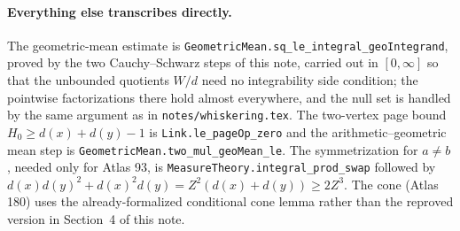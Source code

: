 \documentclass[11pt]{article}
\begin{document}
\paragraph{Everything else transcribes directly.}
The geometric-mean estimate is
\texttt{GeometricMean.sq\_le\_integral\_geoIntegrand}, proved by the two
Cauchy--Schwarz steps of this note, carried out in $[0,\infty]$ so that the
unbounded quotients $W/d$ need no integrability side condition; the pointwise
factorizations there hold almost everywhere, and the null set is handled by the
same argument as in \texttt{notes/whiskering.tex}.  The two-vertex page bound
$H_0\geq d(x)+d(y)-1$ is \texttt{Link.le\_pageOp\_zero} and the
arithmetic--geometric mean step is \texttt{GeometricMean.two\_mul\_geoMean\_le}.
The symmetrization for $a\neq b$, needed only for Atlas 93, is
\texttt{MeasureTheory.integral\_prod\_swap} followed by
$d(x)d(y)^2+d(x)^2d(y)=Z^2(d(x)+d(y))\geq2Z^3$.  The cone (Atlas 180) uses the
already-formalized conditional cone lemma rather than the reproved version in
Section~4 of this note.
\end{document}
